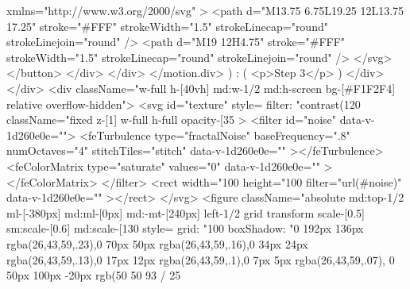 {{{                          xmlns="http://www.w3.org/2000/svg"
                        >
                          <path
                            d="M13.75 6.75L19.25 12L13.75 17.25"
                            stroke="#FFF"
                            strokeWidth="1.5"
                            strokeLinecap="round"
                            strokeLinejoin="round"
                          />
                          <path
                            d="M19 12H4.75"
                            stroke="#FFF"
                            strokeWidth="1.5"
                            strokeLinecap="round"
                            strokeLinejoin="round"
                          />
                        </svg>
                      </button>
                    </div>
                  </div>
                </motion.div>
              ) : (
                <p>Step 3</p>
              )}
            </div>
          </div>
          <div className="w-full h-[40vh] md:w-1/2 md:h-screen bg-[#F1F2F4] relative overflow-hidden">
            <svg
              id="texture"
              style={{ filter: "contrast(120%
              className="fixed z-[1] w-full h-full opacity-[35%
            >
              <filter id="noise" data-v-1d260e0e="">
                <feTurbulence
                  type="fractalNoise"
                  baseFrequency=".8"
                  numOctaves="4"
                  stitchTiles="stitch"
                  data-v-1d260e0e=""
                ></feTurbulence>
                <feColorMatrix
                  type="saturate"
                  values="0"
                  data-v-1d260e0e=""
                ></feColorMatrix>
              </filter>
              <rect
                width="100%
                height="100%
                filter="url(#noise)"
                data-v-1d260e0e=""
              ></rect>
            </svg>
            <figure
              className="absolute md:top-1/2 ml-[-380px] md:ml-[0px] md:-mt-[240px] left-1/2 grid transform scale-[0.5] sm:scale-[0.6] md:scale-[130%
              style={{
                grid: "100%
                boxShadow:
                  "0 192px 136px rgba(26,43,59,.23),0 70px 50px rgba(26,43,59,.16),0 34px 24px rgba(26,43,59,.13),0 17px 12px rgba(26,43,59,.1),0 7px 5px rgba(26,43,59,.07), 0 50px 100px -20px rgb(50 50 93 / 25%
}}}}}}

